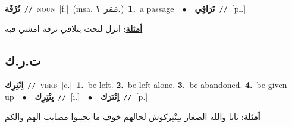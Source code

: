 \documentclass[10pt,a4paper,twoside]{article} %
\begin{document}
\begin{multicols}{2}
{{{{{{{{{\setlength\topsep{0pt}\textbf{\foreignlanguage{arabic}{تُرْقَة}}\ {\color{gray}\texttt{//}\color{black}}\ \textsc{noun}\ [f.]\ \color{gray}(msa. \foreignlanguage{arabic}{مَمَر}~\foreignlanguage{arabic}{\textbf{١.}})\color{black}\ \textbf{1.}~a passage\ \ $\bullet$\ \ \setlength\topsep{0pt}\textbf{\foreignlanguage{arabic}{تَرَاقِي}}\ {\color{gray}\texttt{//}\color{black}}\ [pl.]\  \begin{flushright}\color{gray}\foreignlanguage{arabic}{\textbf{\underline{\foreignlanguage{arabic}{أمثلة}}}: انزل لتحت بتلاقي ترقة امشي فيه}\end{flushright}\color{black}} \vspace{2mm}

\vspace{-3mm}
\subsection*{\color{blue}\foreignlanguage{arabic}{ت.ر.ك}\color{blue}{}} 

{\setlength\topsep{0pt}\textbf{\foreignlanguage{arabic}{اِنْتِرِك}}\ {\color{gray}\texttt{//}\color{black}}\ \textsc{verb}\ [c.]\ \textbf{1.}~be left.  \textbf{2.}~be left alone.  \textbf{3.}~be abandoned.  \textbf{4.}~be given up\ \ $\bullet$\ \ \setlength\topsep{0pt}\textbf{\foreignlanguage{arabic}{يِنْتِرِك}}\ {\color{gray}\texttt{//}\color{black}}\ [i.]\ \ $\bullet$\ \ \setlength\topsep{0pt}\textbf{\foreignlanguage{arabic}{اِنْتَرَك}}\ {\color{gray}\texttt{//}\color{black}}\ [p.]\  \begin{flushright}\color{gray}\foreignlanguage{arabic}{\textbf{\underline{\foreignlanguage{arabic}{أمثلة}}}: يابا والله الصغار بيِنْتِركوش لحالهم خوف ما يجيبوا مصايب الهم والكم}\end{flushright}\color{black}} \vspace{2mm}

}}}}}}}}
\end{multicols}
\end{document}
